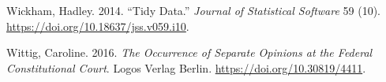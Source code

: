 \documentclass[
  11pt,
]{article}
\newlength{\cslhangindent}
\newenvironment{CSLReferences}[2] %
 {%
  \setlength{\parindent}{0pt}
  \ifodd #1 \everypar{\setlength{\hangindent}{\cslhangindent}}\ignorespaces\fi
  \ifnum #2 > 0
  \setlength{\parskip}{#2\baselineskip}
  \fi
 }%
 {}
\begin{document}
\begin{CSLReferences}{1}{0}
\leavevmode{}%
Wickham, Hadley. 2014. {``Tidy {Data}.''} \emph{Journal of Statistical
Software} 59 (10). \url{https://doi.org/10.18637/jss.v059.i10}.

\leavevmode{}%
Wittig, Caroline. 2016. \emph{The {Occurrence} of {Separate Opinions} at
the {Federal Constitutional Court}}. {Logos Verlag Berlin}.
\url{https://doi.org/10.30819/4411}.

\end{CSLReferences}
\end{document}
